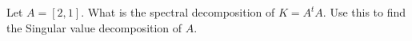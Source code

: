 \documentclass{amsart}
\begin{document}
	
\vspace{2em}

Let $A=[2,1]$. What is the spectral decomposition of $K=A^tA$. Use this to find the Singular value decomposition of $A$.
\end{document}
